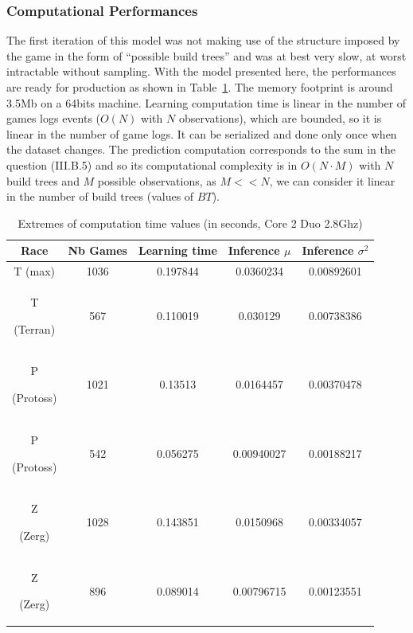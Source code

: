 \subsubsection{Computational Performances}
The first iteration of this model was not making use of the structure imposed by the game in the form of ``possible build trees'' and was at best very slow, at worst intractable without sampling. With the model presented here, the performances are ready for production as shown in Table~\ref{CPU}. The memory footprint is around 3.5Mb on a 64bits machine. Learning computation time is linear in the number of games logs events ($O(N)$ with $N$ observations), which are bounded, so it is linear in the number of game logs. It can be serialized and done only once when the dataset changes. The prediction computation corresponds to the sum in the question (III.B.5) and so its computational complexity is in $O(N\cdot M)$ with $N$ build trees and $M$ possible observations, as $M << N$, we can consider it linear in the number of build trees (values of $BT$).

\begin{table}[h]
\caption{Extremes of computation time values (in seconds, Core 2 Duo 2.8Ghz)}
\begin{center}
\begin{tabular}{|c|cc|cc|}
\hline
Race
& Nb Games
& Learning time
& Inference $\mu$
& Inference $\sigma^2$ \\ \hline
T (max) & 1036 & 0.197844 & 0.0360234 & 0.00892601 \\
T \begin{tiny}(Terran)\end{tiny} & 567 & 0.110019 & 0.030129 & 0.00738386 \\ 
P \begin{tiny}(Protoss)\end{tiny} & 1021 & 0.13513 & 0.0164457 & 0.00370478 \\
P \begin{tiny}(Protoss)\end{tiny} & 542 & 0.056275 & 0.00940027 & 0.00188217 \\ 
Z \begin{tiny}(Zerg)\end{tiny} & 1028 & 0.143851 & 0.0150968 & 0.00334057 \\
Z \begin{tiny}(Zerg)\end{tiny} & 896 & 0.089014 & 0.00796715 & 0.00123551 \\ \hline
\end{tabular}
\label{CPU}
\end{center}
\end{table}

